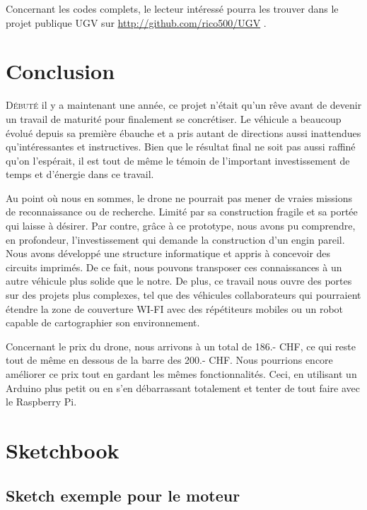 \documentclass[a4paper,11pt]{report}
\begin{document}
{\begin{enumerate}
\begin{enumerate}
Concernant les codes complets, le lecteur intéressé pourra les trouver dans le projet publique UGV sur \url{http://github.com/rico500/UGV} .

\chapter{Conclusion}

\lettrine{D}{ébuté} il y a maintenant une année, ce projet n'était qu'un rêve avant de devenir un travail de maturité pour finalement se concrétiser. Le véhicule a beaucoup évolué depuis sa première ébauche et a pris autant de directions aussi inattendues qu'intéressantes et instructives. Bien que le résultat final ne soit pas aussi raffiné qu'on l'espérait, il est tout de même le témoin de l'important investissement de temps et d'énergie dans ce travail.

Au point où nous en sommes, le drone ne pourrait pas mener de vraies missions de reconnaissance ou de recherche. Limité par sa construction fragile et sa portée qui laisse à désirer. Par contre, grâce à ce prototype, nous avons pu comprendre, en profondeur, l'investissement qui demande la construction d'un engin pareil. Nous avons développé une structure informatique et appris à concevoir des circuits imprimés. De ce fait, nous pouvons transposer ces connaissances à un autre véhicule plus solide que le notre. De plus, ce travail nous ouvre des portes sur des projets plus complexes, tel que des véhicules collaborateurs qui pourraient étendre la zone de couverture WI-FI avec des répétiteurs mobiles ou un robot capable de cartographier son environnement.

Concernant le prix du drone, nous arrivons à un total de 186.- CHF, ce qui reste tout de même en dessous de la barre des 200.- CHF. Nous pourrions encore améliorer ce prix tout en gardant les mêmes fonctionnalités. Ceci, en utilisant un Arduino plus petit ou en s'en débarrassant totalement et tenter de tout faire avec le Raspberry Pi. 

\clearpage

\appendix

\chapter{Sketchbook}

\section{Sketch exemple pour le moteur}



\end{enumerate}
\end{enumerate}}
\end{document}
